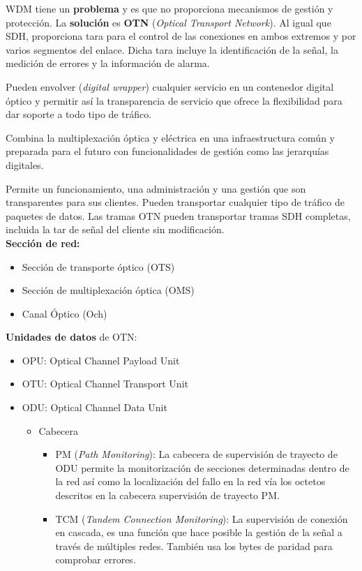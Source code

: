 \documentclass[10pt,portrait, twocolumn]{article}
\begin{document}
WDM tiene un \textbf{problema} y es que no proporciona mecanismos de gestión y protección. La \textbf{solución} es \textbf{OTN} (\textit{Optical Transport Network}). Al igual que SDH, proporciona tara para el control de las conexiones en ambos extremos y por varios segmentos del enlace. Dicha tara incluye la identificación de la señal, la medición de errores y la información de alarma.

\quad Pueden envolver (\textit{digital wrapper}) cualquier servicio en un contenedor digital óptico y permitir así la transparencia de servicio que ofrece la flexibilidad para dar soporte a todo tipo de tráfico.

\quad Combina la multiplexación óptica y eléctrica en una infraestructura común y preparada para el futuro con funcionalidades de gestión como las jerarquías digitales.

\quad Permite un funcionamiento, una administración y una gestión que son transparentes para sus clientes. Pueden transportar cualquier tipo de tráfico de paquetes de datos. Las tramas OTN pueden transportar tramas SDH completas, incluida la tar de señal del cliente sin modificación. \\

\textbf{Sección de red:}

	\begin{itemize}
	\item Sección de transporte óptico (OTS)
	\item Sección de multiplexación óptica (OMS)
	\item Canal Óptico (Och)
	\end{itemize}
	
\textbf{Unidades de datos} de OTN:

	\begin{itemize}
	\item OPU: Optical Channel Payload Unit
	\item OTU: Optical Channel Transport Unit
	\item ODU: Optical Channel Data Unit
		\begin{itemize}
		\item Cabecera
			\begin{itemize}
			\item PM (\textit{Path Monitoring}): La cabecera de supervisión de trayecto de ODU permite la monitorización de secciones determinadas dentro de la red así como la localización del fallo en la red vía los octetos descritos en la cabecera supervisión de trayecto PM.
			\item TCM (\textit{Tandem Connection Monitoring}): La supervisión de conexión en cascada, es una función que hace posible la gestión de la señal a través de múltiples redes. También usa los bytes de paridad para comprobar errores.
			\end{itemize}
		\end{itemize}
	\end{itemize}
\end{document}
